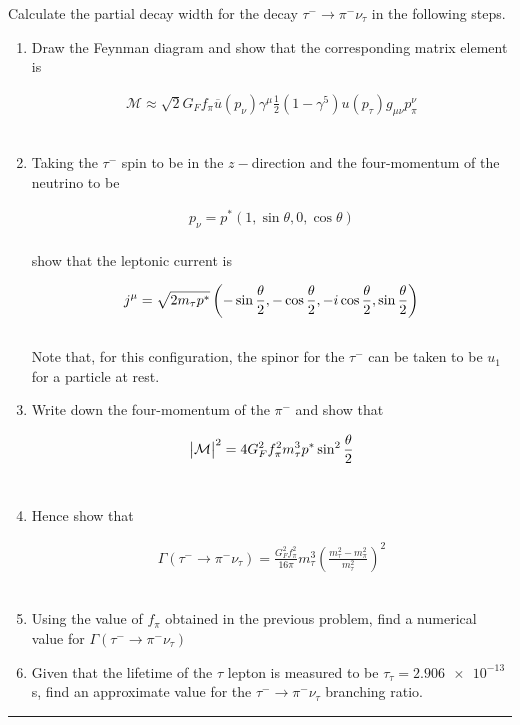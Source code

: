 \begin{problem}{11.10}
Calculate the partial decay width for the decay $\tau^- \to \pi^-\nu_\tau$ in the following steps.

\begin{enumerate}[label=(\alph*)]
    \item Draw the Feynman diagram and show that the corresponding matrix element is
    
    \begin{align*}
        \mathcal{M} \approx \sqrt{2}G_F f_\pi \overbar{u}(p_\nu) \gamma^\mu \frac{1}{2}\left( 1-\gamma^5 \right) u(p_\tau)g_{\mu\nu}p_\pi^\nu
    \end{align*}\\
    \item Taking the $\tau^-$ spin to be in the $z-$direction and the four-momentum of the neutrino to be 
    
    \begin{align*}
        p_\nu = p^\ast \left( 1,\sin\theta,0,\cos\theta \right)
    \end{align*}\\
    show that the leptonic current is 

    \begin{align*}
        j^\mu = \sqrt{2m_\tau p^\ast } \left( -\sin\frac{\theta}{2},-\cos\frac{\theta}{2},-i\cos\frac{\theta}{2},\sin\frac{\theta}{2} \right)
    \end{align*}\\
    Note that, for this configuration, the spinor for the $\tau^-$ can be taken to be $u_1$ for a particle at rest.

    \item Write down the four-momentum of the $\pi^-$ and show that
    
    \begin{align*}
        \big| \mathcal{M} \big|^2 = 4G_F^2 f_\pi^2 m_\tau^3 p^\ast \sin^2 \frac{\theta}{2}
    \end{align*}\\
    \item Hence show that 
    
    \begin{align*}
        \Gamma\left( \tau^- \to \pi^- \nu_\tau \right) = \frac{G_F^2 f_\pi^2}{16\pi} m_\tau^3 \left( \frac{m_\tau^2 - m_\pi^2}{m_\tau^2} \right)^2
    \end{align*}\\
    \item Using the value of $f_\pi$ obtained in the previous problem, find a numerical value for $\Gamma\left( \tau^- \to \pi^- \nu_\tau \right)$
    \item Given that the lifetime of the $\tau$ lepton is measured to be $\tau_\tau=\num{2.906e-13}$s, find an approximate value for the $\tau^- \to \pi^- \nu_\tau$ branching ratio.
\end{enumerate}
\end{problem}
\begin{solution}

\end{solution}

\noindent\rule{7in}{1.5pt}

